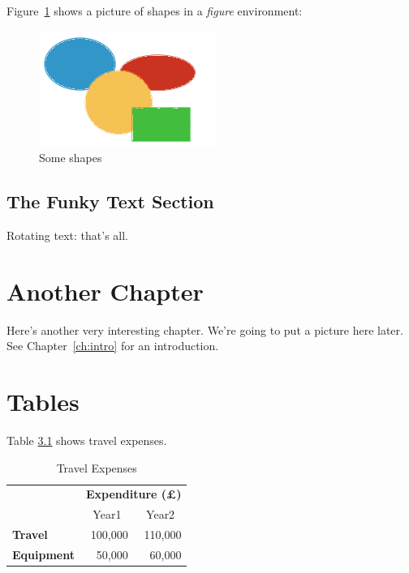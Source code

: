 \documentclass[12pt]{scrbook}
\begin{document}
Figure~\ref{fig:shapes} shows a picture of shapes in a \emph{figure} environment:

\begin{figure}[htbp]
    \centering
    \includegraphics{shapes}
    \caption{Some shapes}
    \label{fig:shapes}
\end{figure}

\section{The Funky Text Section}
Rotating text: 
that's all.


\chapter{Another Chapter}
\label{ch:another}

Here's another very interesting chapter.
We're going to put a picture here later.
See Chapter~\ref{ch:intro} for an introduction.

\chapter{Tables}

Table \ref{tab:travel_expenses} shows travel expenses.
\begin{table}[htbp]
    \caption{Travel Expenses}
    \label{tab:travel_expenses}
    \centering
    \begin{tabular}{lrr}
                        & \multicolumn{2}{c}{\bfseries Expenditure (\pounds)} \\
                        & \multicolumn{1}{c}{Year1} & \multicolumn{1}{c}{Year2} \\
    \bfseries Travel    & 100,000 & 110,000 \\
    \bfseries Equipment & 50,000  & 60,000
    \end{tabular}
\end{table}
\end{document}
